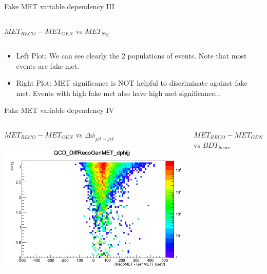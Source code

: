 \documentclass[8pt]{beamer}
\begin{document}
\begin{frame}{Fake MET variable dependency III}
\begin{columns}
\begin{block}{$MET_{RECO}-MET_{GEN}$ vs $MET_{Sig}$}
\end{block}

\end{columns}

\begin{itemize}
  \item Left Plot: We can see clearly the 2 populations of events. Note that most events are fake met.
  \item Right Plot: MET significance is NOT helpful to discriminate against fake met. Events with high fake met also have high met significance... 
\end{itemize}

\end{frame}

\begin{frame}{Fake MET variable dependency IV}
 
\begin{columns}

\begin{block}{$MET_{RECO}-MET_{GEN}$ vs $\Delta\phi_{jet-jet}$}
 
\centering
\includegraphics[width=\linewidth]{img/QCD_DiffRecoGenMET_dphijj.png} 
 
\end{block}

\begin{block}{$MET_{RECO}-MET_{GEN}$ vs $BDT_{Score}$}


\end{block}
\end{columns}
\end{frame}
\end{document}
